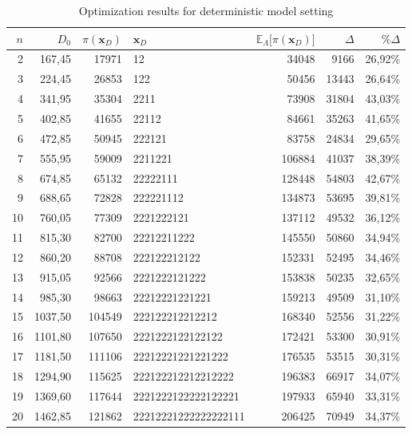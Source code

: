 \documentclass[preprint,12pt]{elsarticle}
\begin{document}
\begin{table}[htbp]
  \indent
  \caption{Optimization results for deterministic model setting }
    \begin{tabular}{rrrlrrr}
    \toprule
    $n$     & $D_{0}$  & $\pi(\boldsymbol{x}_{D})$ & $\boldsymbol{x}_{D}$ & $\mathbb{E}_{\Lambda} \bigg[ \pi(\boldsymbol{x}_{D})\bigg]$ & $\Delta$ & $\% \Delta$ \\
    \midrule
    2     & 167,45 & 17971 & 12    & 34048 & 9166  & 26,92\% \\
    3     & 224,45 & 26853 & 122   & 50456 & 13443 & 26,64\% \\
    4     & 341,95 & 35304 & 2211  & 73908 & 31804 & 43,03\% \\
    5     & 402,85 & 41655 & 22112 & 84661 & 35263 & 41,65\% \\
    6     & 472,85 & 50945 & 222121 & 83758 & 24834 & 29,65\% \\
    7     & 555,95 & 59009 & 2211221 & 106884 & 41037 & 38,39\% \\
    8     & 674,85 & 65132 & 22222111 & 128448 & 54803 & 42,67\% \\
    9     & 688,65 & 72828 & 222221112 & 134873 & 53695 & 39,81\% \\
    10    & 760,05 & 77309 & 2221222121 & 137112 & 49532 & 36,12\% \\
    11    & 815,30 & 82700 & 22212211222 & 145550 & 50860 & 34,94\% \\
    12    & 860,20 & 88708 & 222122212122 & 152331 & 52495 & 34,46\% \\
    13    & 915,05 & 92566 & 2221222121222 & 153838 & 50235 & 32,65\% \\
    14    & 985,30 & 98663 & 22212221221221  & 159213 & 49509 & 31,10\% \\
    15    & 1037,50 & 104549 & 222122212212212  & 168340 & 52556 & 31,22\% \\
    16    & 1101,80 & 107650 & 2221222122122122  & 172421 & 53300 & 30,91\% \\
    17    & 1181,50 & 111106 & 22212221221221222  & 176535 & 53515 & 30,31\% \\
    18    & 1294,90 & 115625 & 222122212212212222  & 196383 & 66917 & 34,07\% \\
    19    & 1369,60 & 117644 & 2221222122222122221 & 197933 & 65940 & 33,31\% \\
    20    & 1462,85 & 121862 & 22212221222222222111  & 206425 & 70949 & 34,37\% \\

\end{tabular}
\end{table}
\end{document}
